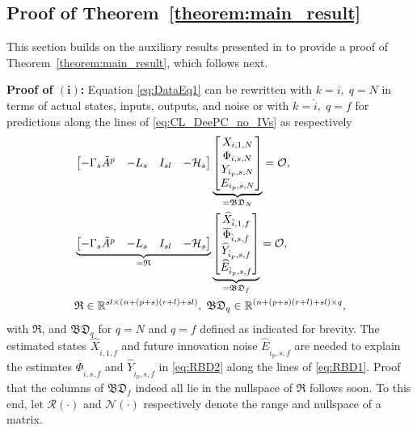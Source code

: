 \subsection{Proof of Theorem~\ref{theorem:main_result}}%
This section builds on the auxiliary results presented in  to provide a proof of Theorem~\ref{theorem:main_result}, which follows next.

\noindent\textbf{Proof of $\mathrm{\mathbf{(i)}}$:} 
Equation \eqref{eq:DataEq1} can be rewritten with $k=i,\;q=N$ in terms of actual states, inputs, outputs, and noise or with $k=\hat{i},\;q=f$ for predictions along the lines of \eqref{eq:CL_DeePC_no_IVs} as respectively
\begin{align}
    &\begin{bmatrix}-\Gamma_s \tilde{A}^p & -L_s & I_{sl}&-\mathcal{H}_s\end{bmatrix}
    \underbrace{\begin{bmatrix}
        X_{i,1,N}\\
        \Phi_{i,s,N}\\
        Y_{i_p,s,N}\\
        E_{i_p,s,N}
    \end{bmatrix}}_{=\mathfrak{BD}_N}=\mathcal{O},\label{eq:RBD1}\\
    &\underbrace{\begin{bmatrix}-\Gamma_s \tilde{A}^p & -L_s & I_{sl}&-\mathcal{H}_s\end{bmatrix}}_{= \mathfrak{R}}
    \underbrace{\begin{bmatrix}
        \widehat{X}_{\hat{i},1,f}\\
        \overline{\Phi}_{\hat{i},s,f}\\
        \widehat{Y}_{\hat{i}_p,s,f}\\
        \widehat{E}_{\hat{i}_p,s,f}
    \end{bmatrix}}_{=\mathfrak{BD}_f}=\mathcal{O},\label{eq:RBD2}\\
    &\mathfrak{R}\in\mathbb{R}^{sl\times (n+(p+s)(r+l)+sl)},\;\mathfrak{BD}_q\in\mathbb{R}^{(n+(p+s)(r+l)+sl) \times q},\notag
\end{align}
with $\mathfrak{R}$, and $\mathfrak{BD}_q$ for $q=N$ and $q=f$ defined as indicated for brevity. The estimated states $\widehat{X}_{\hat{i},1,f}$ and future innovation noise $\widehat{E}_{\hat{i}_p,s,f}$ are needed to explain the estimates $\overline{\Phi}_{\hat{i},s,f}$ and $\widehat{Y}_{\hat{i}_p,s,f}$ in \eqref{eq:RBD2} along the lines of \eqref{eq:RBD1}. Proof that the columns of $\mathfrak{BD}_f$ indeed all lie in the nullspace of $\mathfrak{R}$ follows soon. To this end, let $\mathcal{R}(\cdot)$ and $\mathcal{N}(\cdot)$ respectively denote the range and nullspace of a matrix.

